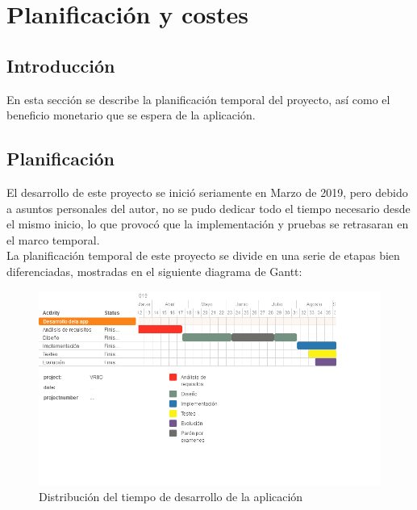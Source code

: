 \section{Planificación y costes}

\subsection{Introducción}
\quad En esta sección se describe la planificación temporal del proyecto, así como el beneficio monetario que se espera de la aplicación.\\

\subsection{Planificación}

\quad El desarrollo de este proyecto se inició seriamente en Marzo de 2019, pero debido a asuntos personales del autor, no se pudo dedicar todo el tiempo necesario desde el mismo inicio, lo que provocó que la implementación y pruebas se retrasaran en el marco temporal.\\

\quad La planificación temporal de este proyecto se divide en una serie de etapas bien diferenciadas, mostradas en el siguiente diagrama de Gantt:\\

\begin{figure}[htb]
	\centering
	\includegraphics[width=1.2\textwidth]{./imagenes/diagramaGantt}
	\caption{Distribución del tiempo de desarrollo de la aplicación}
\end{figure}

\newpage

